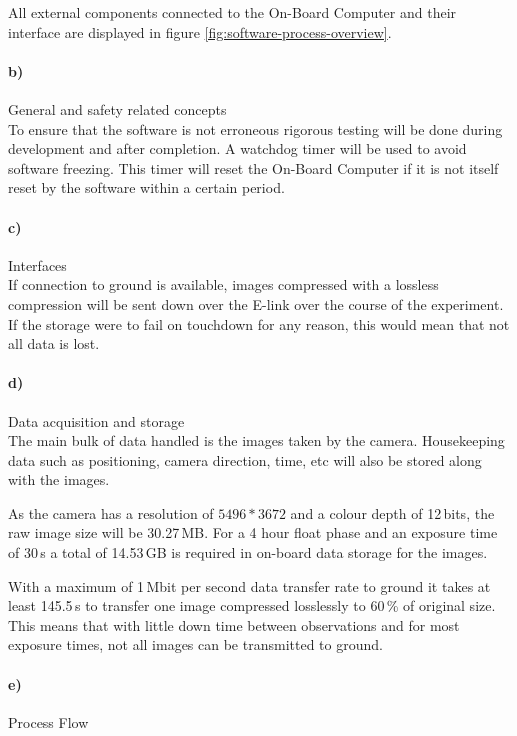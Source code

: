 All external components connected to the On-Board Computer and their interface are displayed in figure \ref{fig:software-process-overview}.

\paragraph{b)} General and safety related concepts\\

To ensure that the software is not erroneous rigorous testing will be done during development and after completion. A watchdog timer will be used to avoid software freezing. This timer will reset the On-Board Computer if it is not itself reset by the software within a certain period.

\paragraph{c)} Interfaces\\

If connection to ground is available, images compressed with a lossless compression will be sent down over the E-link over the course of the experiment. If the storage were to fail on touchdown for any reason, this would mean that not all data is lost.





\paragraph{d)} Data acquisition and storage\\

The main bulk of data handled is the images taken by the camera. Housekeeping data such as positioning, camera direction, time, etc will also be stored along with the images.

As the camera has a resolution of $5496 * 3672$ and a colour depth of 12\,bits, the raw image size will be 30.27\,MB. For a 4 hour float phase and an exposure time of 30\,s a total of  14.53\,GB is required in on-board data storage for the images.

With a maximum of 1\,Mbit per second data transfer rate to ground it takes at least 145.5\,s to transfer one image compressed losslessly to 60\,\% of original size. This means that with little down time between observations and for most exposure times, not all images can be transmitted to ground.

\paragraph{e)} Process Flow\\

